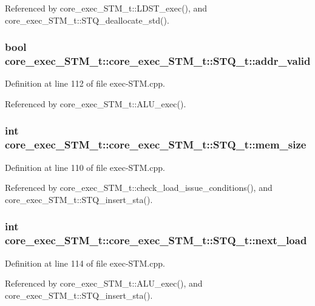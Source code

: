 Referenced by core\_\-exec\_\-STM\_\-t::LDST\_\-exec(), and core\_\-exec\_\-STM\_\-t::STQ\_\-deallocate\_\-std().
\subsubsection[{addr\_\-valid}]{\setlength{\rightskip}{0pt plus 5cm}bool core\_\-exec\_\-STM\_\-t::core\_\-exec\_\-STM\_\-t::STQ\_\-t::addr\_\-valid}\label{structcore__exec__STM__t_1_1STQ__t_9847f16ee60f4b161e68fa9202d52925}




Definition at line 112 of file exec-STM.cpp.

Referenced by core\_\-exec\_\-STM\_\-t::ALU\_\-exec().
\subsubsection[{mem\_\-size}]{\setlength{\rightskip}{0pt plus 5cm}int core\_\-exec\_\-STM\_\-t::core\_\-exec\_\-STM\_\-t::STQ\_\-t::mem\_\-size}\label{structcore__exec__STM__t_1_1STQ__t_cd93245ef2cdad52715eb371a359fba5}




Definition at line 110 of file exec-STM.cpp.

Referenced by core\_\-exec\_\-STM\_\-t::check\_\-load\_\-issue\_\-conditions(), and core\_\-exec\_\-STM\_\-t::STQ\_\-insert\_\-sta().
\subsubsection[{next\_\-load}]{\setlength{\rightskip}{0pt plus 5cm}int core\_\-exec\_\-STM\_\-t::core\_\-exec\_\-STM\_\-t::STQ\_\-t::next\_\-load}\label{structcore__exec__STM__t_1_1STQ__t_e23b7aa44f05976db139a5c296f54adb}




Definition at line 114 of file exec-STM.cpp.

Referenced by core\_\-exec\_\-STM\_\-t::ALU\_\-exec(), and core\_\-exec\_\-STM\_\-t::STQ\_\-insert\_\-sta().
